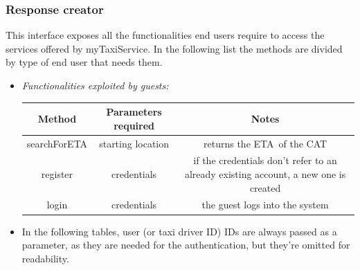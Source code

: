 \documentclass{article}
\begin{document}
	\subsubsection{Response creator}
	This interface exposes all the functionalities end users require to access the services offered by myTaxiService. 
	In the following list the methods are divided by type of end user that needs them. 
	\begin{itemize}
		\item \textit{Functionalities exploited by guests:}	\\
			\begin{table}[H]
				\begin{adjustbox}{width=1.2\textwidth}
					\begin{tabular}{*{3}{c}}
						\toprule
						Method & Parameters required & Notes \\
						\midrule
						searchForETA & starting location & returns the ETA\footnotemark\  of the CAT\footnotemark\\ %
						register & credentials & if the credentials don't refer to an already existing account, a new one is created \\
						login & credentials & the guest logs into the system \\
						\bottomrule
					\end{tabular}
				\end{adjustbox}
			\end{table}

		\item In the following tables, user (or taxi driver ID) IDs are always passed as a parameter, as they are needed for the authentication, but they're omitted for readability. \\	


\end{itemize}
\end{document}

